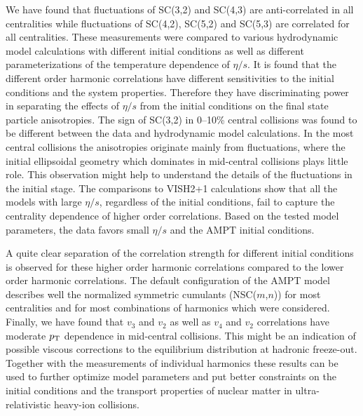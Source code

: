 We have found that fluctuations of SC(3,2) and SC(4,3) are anti-correlated in all centralities while fluctuations of SC(4,2), SC(5,2) and SC(5,3) are correlated for all centralities. 
These measurements were compared to various hydrodynamic model calculations with different initial conditions as well as different parameterizations of the temperature dependence of $\eta/s$.
It is found that the different order harmonic correlations have different sensitivities to the initial conditions and the system properties. Therefore they have discriminating power in separating the effects of $\eta/s$  from the initial conditions on the final state particle anisotropies.
The sign of SC(3,2) in 0--10\% central collisions was found to be different between the data and hydrodynamic model calculations.
In the most central collisions the anisotropies originate mainly from fluctuations, where the initial ellipsoidal geometry which dominates in mid-central collisions plays little role. This observation might help to understand the details of the fluctuations in the initial stage. 
The comparisons to VISH2+1 calculations show that all the models with large $\eta/s$, regardless of the initial conditions, fail to capture the centrality dependence of higher order correlations. 
Based on the tested model parameters, the data favors small $\eta/s$ and the AMPT initial conditions. 

A quite clear separation of the correlation strength for different initial conditions is observed for these higher order harmonic correlations compared to the lower order harmonic correlations.
The default configuration of the AMPT model describes well the normalized symmetric cumulants (NSC($m$,$n$)) for most centralities and for most combinations of harmonics which were considered. %
Finally, we have found that $v_3$ and $v_2$ as well as $v_4$ and $v_2$ correlations have moderate $p_{\rm T}$ dependence in mid-central collisions. This might be an indication of possible viscous corrections to the equilibrium distribution at hadronic freeze-out.
Together with the measurements of individual harmonics these results can be used to further optimize model parameters and put better constraints on the initial conditions and the transport properties of nuclear matter in ultra-relativistic heavy-ion collisions.

